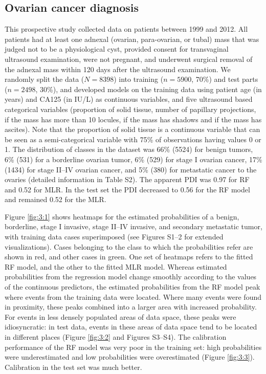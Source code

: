 \subsection{Ovarian cancer diagnosis}
This prospective study collected data on patients between 1999 and 2012. All
patients had at least one adnexal (ovarian, para-ovarian, or tubal) mass that
was judged not to be a physiological cyst, provided consent for transvaginal
ultrasound examination, were not pregnant, and underwent surgical removal of the
adnexal mass within 120 days after the ultrasound examination. We randomly split
the data ($N = 8398$) into training ($n = 5900$, 70\%) and test parts ($n =
2498$, 30\%), and developed models on the training data using patient age (in
years) and \gls{CA125} (in IU/L) as continuous variables, and five ultrasound based
categorical variables (proportion of solid tissue, number of papillary
projections, if the mass has more than 10 locules, if the mass has shadows and
if the mass has ascites). Note that the proportion of solid tissue is a
continuous variable that can be seen as a semi-categorical variable with 75\% of
observations having values 0 or 1. The distribution of classes in the dataset
was 66\% (5524) for benign tumors, 6\% (531) for a borderline ovarian tumor,
6\% (529) for stage I ovarian cancer, 17\% (1434) for stage II--IV ovarian
cancer, and 5\% (380) for metastatic cancer to the ovaries (detailed information
in Table S2). The apparent \gls{PDI} was 0.97 for \gls{RF} and 0.52 for \gls{MLR}. In the test set
the \gls{PDI} decreased to 0.56 for the \gls{RF} model and remained 0.52 for the \gls{MLR}.

Figure \ref{fig:3:1} shows heatmaps for the estimated probabilities of a benign, borderline,
stage I invasive, stage II--IV invasive, and secondary metastatic tumor, with
training data cases superimposed (see Figures S1--2 for extended
visualizations). Cases belonging to the class to which the probabilities refer
are shown in red, and other cases in green. One set of heatmaps refers to the
fitted \gls{RF} model, and the other to the fitted \gls{MLR} model. Whereas estimated
probabilities from the regression model change smoothly according to the values
of the continuous predictors, the estimated probabilities from the \gls{RF} model peak
where events from the training data were located. Where many events were found
in proximity, these peaks combined into a larger area with increased
probability. For events in less densely populated areas of data space, these
peaks were idiosyncratic: in test data, events in these areas of data space tend
to be located in different places (Figure \ref{fig:3:2} and Figures S3--S4). The
calibration performance of the \gls{RF} model was very poor in the training set: high
probabilities were underestimated and low probabilities were overestimated
(Figure \ref{fig:3:3}). Calibration in the test set was much better.

